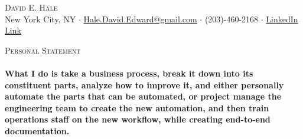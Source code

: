 \documentclass[a4paper]{article}
\newcommand{\lineunder} {
    \vspace*{-8pt} \\
    \hspace*{-18pt} \hrulefill \\
}
\newcommand{\header} [1] {
    {\hspace*{-18pt}\vspace*{6pt} \textsc{#1}}
    \vspace*{-6pt} \lineunder
}
\begin{document}
\vspace*{-40pt}

    

\vspace*{-9pt}
\begin{center}
	{\Large \scshape {David E. Hale}}\\
	New York City, NY $\cdot$ \href{mailto:Hale.David.Edward@gmail.com}{Hale.David.Edward@gmail.com} $\cdot$ (203)-460-2168 $\cdot$ \href{http://linkedin.com/in/david-hale-2598a791/}{LinkedIn Link}\\
\end{center}

\header{Personal Statement}
\vspace{1mm}
\textbf{What I do is take a business process, break it down into its constituent parts, analyze how to improve it, and either personally automate the parts that can be automated, or project manage the engineering team to create the new automation, and then train operations staff on the new workflow, while creating end-to-end documentation.
}
\end{document}
